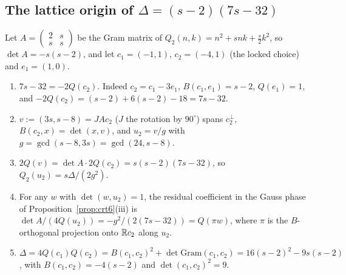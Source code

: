 \subsection{The lattice origin of $\Delta=(s-2)(7s-32)$}\label{sec:rev7delta}
Let $A=\left(\begin{smallmatrix}2&s\\s&s\end{smallmatrix}\right)$ be the Gram matrix of $Q_2(n,k)=n^2+snk+\tfrac s2k^2$, so $\det A=-s(s-2)$, and let $c_1=(-1,1)$, $c_2=(-4,1)$ (the locked choice) and $e_1=(1,0)$.
\begin{proposition}[\src{37}, \S2]\label{prop:delta7}
\begin{enumerate}[label=(\roman*)]
\item $7s-32=-2Q(c_2)$. Indeed $c_2=c_1-3e_1$, $B(c_1,e_1)=s-2$, $Q(e_1)=1$, and $-2Q(c_2)=(s-2)+6(s-2)-18=7s-32$.
\item $v:=(3s,s-8)=JAc_2$ ($J$ the rotation by $90^\circ$) spans $c_2^\perp$, $B(c_2,x)=\det(x,v)$, and $u_2=v/g$ with $g=\gcd(s-8,3s)=\gcd(24,s-8)$.
\item $2Q(v)=\det A\cdot2Q(c_2)=s(s-2)(7s-32)$, so $Q_2(u_2)=s\Delta/(2g^2)$.
\item For any $w$ with $\det(w,u_2)=1$, the residual coefficient in the Gauss phase of Proposition~\ref{prop:crt6}(iii) is $\det A/(4Q(u_2))=-g^2/(2(7s-32))=Q(\pi w)$, where $\pi$ is the $B$-orthogonal projection onto $\mathbb{R} c_2$ along $u_2$.
\item $\Delta=4Q(c_1)Q(c_2)=B(c_1,c_2)^2+\det\mathrm{Gram}(c_1,c_2)=16(s-2)^2-9s(s-2)$, with $B(c_1,c_2)=-4(s-2)$ and $\det(c_1,c_2)^2=9$.
\end{enumerate}
\end{proposition}

